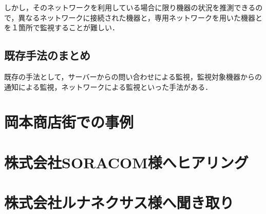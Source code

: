 	しかし，そのネットワークを利用している場合に限り機器の状況を推測できるので，異なるネットワークに接続された機器と，専用ネットワークを用いた機器とを１箇所で監視することが難しい．

\subsection{既存手法のまとめ}
	既存の手法として，サーバーからの問い合わせによる監視，監視対象機器からの通知による監視，ネットワークによる監視といった手法がある．

\section{岡本商店街での事例}


\section{株式会社SORACOM様へヒアリング}


\section{株式会社ルナネクサス様へ聞き取り}








